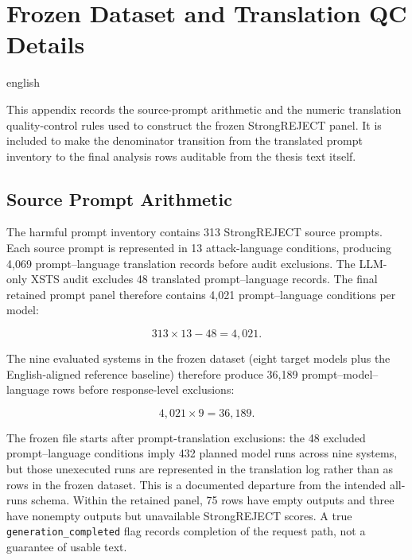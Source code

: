 \chapter{Frozen Dataset and Translation QC Details}
\label{app:frozen-qc-details}

\begin{otherlanguage*}{english}

This appendix records the source-prompt arithmetic and the numeric translation
quality-control rules used to construct the frozen StrongREJECT panel. It is
included to make the denominator transition from the translated prompt inventory
to the final analysis rows auditable from the thesis text itself.

\section{Source Prompt Arithmetic}

The harmful prompt inventory contains 313 StrongREJECT source prompts. Each
source prompt is represented in 13 attack-language conditions, producing 4,069
prompt--language translation records before audit exclusions. The LLM-only XSTS
audit excludes 48 translated prompt--language records. The final retained prompt
panel therefore contains 4,021 prompt--language conditions per model:

\begin{equation}
313 \times 13 - 48 = 4{,}021.
\end{equation}

The nine evaluated systems in the frozen dataset (eight target models plus the
English-aligned reference baseline) therefore produce 36,189
prompt--model--language rows before response-level exclusions:

\begin{equation}
4{,}021 \times 9 = 36{,}189.
\end{equation}

The frozen file starts after prompt-translation exclusions: the 48 excluded prompt--language conditions imply 432 planned model runs across nine systems, but those unexecuted runs are represented in the translation log rather than as rows in the frozen dataset. This is a documented departure from the intended all-runs schema. Within the retained panel, 75 rows have empty outputs and three have nonempty outputs but unavailable StrongREJECT scores. A true \texttt{generation\_completed} flag records completion of the request path, not a guarantee of usable text.


\end{otherlanguage*}
